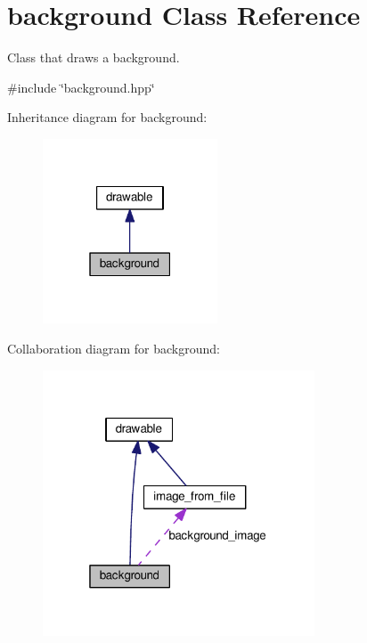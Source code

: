 \hypertarget{classbackground}{}\section{background Class Reference}
\label{classbackground}


Class that draws a background.  




{\ttfamily \#include \char`\"{}background.\+hpp\char`\"{}}



Inheritance diagram for background\+:\nopagebreak
\begin{figure}[H]
\begin{center}
\leavevmode
\includegraphics[width=147pt]{classbackground__inherit__graph}
\end{center}
\end{figure}


Collaboration diagram for background\+:\nopagebreak
\begin{figure}[H]
\begin{center}
\leavevmode
\includegraphics[width=229pt]{classbackground__coll__graph}
\end{center}
\end{figure}
